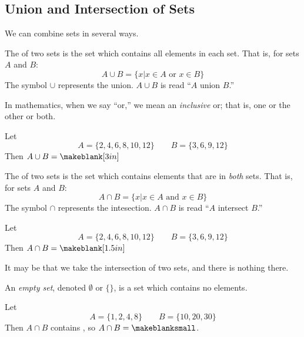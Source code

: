 \subsection{Union and Intersection of Sets} 
We can combine sets in several ways.
\begin{definition}[Union]
The  of two sets is the set which contains all elements in each set. That is, for sets $A$ and $B$:
\[
A\cup B=\{x|x\in A\mbox{ or }x\in B\}
\]
The symbol $\cup$ represents the union. $A\cup B$ is read ``$A$ union $B$.''
\end{definition}
\begin{Note}
In mathematics, when we say ``or,'' we mean an \emph{inclusive} or; that is, one or the other or both.
\end{Note}
\begin{Example}
Let
\[
A=\{2,4,6,8,10,12\}
\qquad
B=\{3,6,9,12\}
\]
Then $A\cup B=\makeblank[3in]$
\end{Example}
\begin{definition}[Intersection]
The  of two sets is the set which contains elements that are in \emph{both} sets. That is, for sets $A$ and $B$:
\[
A\cap B=\{x|x\in A\mbox{ and }x\in B\}
\]
The symbol $\cap$ represents the intesection. $A\cap B$ is read ``$A$ intersect $B$.''
\end{definition}
\begin{Example}
Let
\[
A=\{2,4,6,8,10,12\}
\qquad
B=\{3,6,9,12\}
\]
Then $A\cap B=\makeblank[1.5in]$
\end{Example}
It may be that we take the intersection of two sets, and there is nothing there.
\begin{definition}
An \emph{empty set}, denoted $\emptyset$ or $\{\}$, is a set which contains no elements.
\end{definition}
\begin{Example}
Let
\[
A=\{1,2,4,8\}
\qquad
B=\{10,20,30\}
\]
Then $A\cap B$ contains \makeblank, so $A\cap B=\makeblanksmall$.
\end{Example}